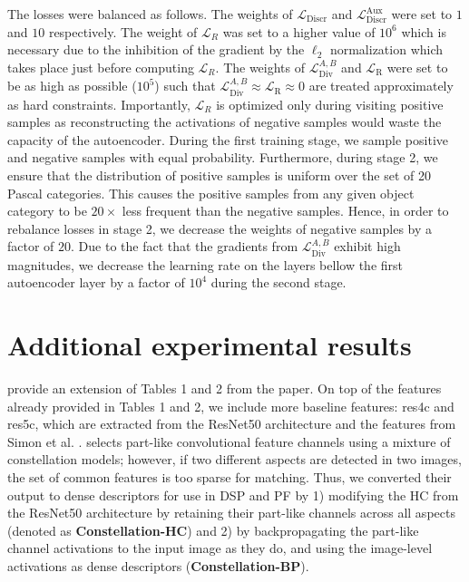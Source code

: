 \documentclass[10pt,twocolumn,letterpaper]{article}
\begin{document}
The losses were balanced as follows. 
The weights of $\mathcal{L}_{\text{Discr}}$ and $\mathcal{L}_{\text{Discr}}^\text{Aux}$ were set to $1$ and $10$ respectively.
The weight of $\mathcal{L}_R$ was set to a higher value of $10^6$ which is necessary due to the inhibition of the gradient by the $\ell_2$ normalization which takes place just before computing $\mathcal{L}_R$. The weights of $\mathcal{L}_{\text{Div}}^{A,B}$ and $\mathcal{L}_{\text{R}}$ were set to be as high as possible ($10^5$) such that 
$\mathcal{L}_{\text{Div}}^{A,B}\approx \mathcal{L}_{\text{R}} \approx 0$ are treated approximately as hard constraints. 
Importantly, $\mathcal{L}_R$ is optimized only during visiting positive samples as reconstructing the activations of negative samples would waste the capacity of the autoencoder.
During the first training stage, we sample positive and negative samples with equal probability. Furthermore, during stage 2, we ensure that the distribution of positive samples
is uniform over the set of 20 Pascal categories. This causes the positive samples from any given object category to be $20 \times$ less frequent than the negative samples. Hence, in order to rebalance losses in stage 2, we decrease the weights of negative samples by a factor of $20$.
Due to the fact that the gradients from $\mathcal{L}_{\text{Div}}^{A,B}$ exhibit high magnitudes, we decrease the learning rate on the layers bellow the first autoencoder layer
by a factor of $10^4$ during the second stage.

\section{Additional experimental results} provide an extension of Tables 1 and 2 from the paper. 
On top of the features already provided in Tables 1 and 2, we include more baseline features: res4c and res5c, which are extracted from the ResNet50 architecture
and the features from Simon et al. \cite{simon2015neural}. 
\cite{simon2015neural} selects part-like convolutional feature channels using a mixture of constellation models; however, if two different aspects are detected in two images, the set of common features is too sparse for matching. Thus, we converted their output to dense descriptors for use in DSP and PF by 1) modifying the HC from the ResNet50 architecture by retaining their part-like channels across all aspects (denoted as \textbf{Constellation-HC}) and 2) by backpropagating the part-like channel activations to the input image as they do, and using the image-level 
activations as dense descriptors (\textbf{Constellation-BP}).
\end{document}
